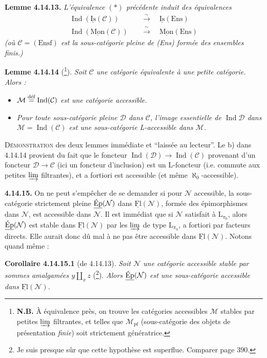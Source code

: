\documentclass[11pt]{article}
\newcommand{\msp}[1]{\marginpar{\footnotesize [#1]}}
\newcommand{\uFl}{\underline{\mathrm{Fl}}}
\newcommand{\uIs}{\underline{\mathrm{Is}}}
\newcommand{\uMon}{\underline{\mathrm{Mon}}}
\newcommand{\uEp}{\underline{\textup{Ép}}}
\newcommand{\defeq}{\overset{\textup{déf}}{=}}
\newcommand{\Ind}{\operatorname{Ind}}
\newcommand{\Ens}{\mathrm{Ens}}
\begin{document}
\textbf{Lemme 4.14.13.} \textit{L'équivalence $(*)$ précédente induit des équivalences}
\[
\begin{aligned}
\Ind(\uIs(\mathcal{C})) \quad &\xrightarrow{\ \sim\ } \quad \uIs(\Ens) \\
\Ind(\uMon(\mathcal{C})) \quad &\xrightarrow{\ \sim\ } \quad \uMon(\Ens)
\end{aligned}
\]
\textit{(où $\mathcal{C} = (\mathrm{Ensf})$ est la sous-catégorie pleine de \textup{(Ens)} formée des ensembles \textup{finis}.)}

\textbf{Lemme 4.14.14} (\footnote[166]{\textbf{N.B.} À équivalence près, on trouve les catégories accessibles $\mathcal{M}$ stables par petites $\varinjlim$ filtrantes, et telles que $\mathcal{M}_{\mathrm{pf}}$ (sous-catégorie des objets de présentation \textit{finie}) soit strictement génératrice.}). \textit{Soit $\mathcal{C}$ une catégorie équivalente à une petite catégorie. Alors :}
\begin{itemize}[nosep]
\item[\textit{a)}] \textit{$\mathcal{M} \defeq \Ind(\mathcal{C})$ est une catégorie accessible.}
\item[\textit{b)}] \textit{Pour toute sous-catégorie pleine $\mathcal{D}$ dans $\mathcal{C}$, l'image essentielle de $\Ind\mathcal{D}$ dans $\mathcal{M} = \Ind(\mathcal{C})$ est une sous-catégorie L-accessible dans $\mathcal{M}$.}
\end{itemize}
\textsc{Démonstration} des deux lemmes immédiate et ``laissée au lecteur''. Le b) dans 4.14.14 provient du fait que le foncteur $\Ind(\mathcal{D}) \longrightarrow \Ind(\mathcal{C})$ provenant d'un foncteur $\mathcal{D} \longrightarrow \mathcal{C}$ (ici un
\msp{page 387}
foncteur d'inclusion) est un L-foncteur (i.e. commute aux petites $\varinjlim$ filtrantes), et a fortiori est accessible (et même $\aleph_0$-accessible).

\textbf{4.14.15.} On ne peut s'empêcher de se demander si pour $\mathcal{N}$ accessible, la sous-catégorie strictement pleine $\uEp(\mathcal{N})$ dans $\uFl(\mathcal{N})$, formée des épimorphismes dans $\mathcal{N}$, est accessible dans $\mathcal{N}$. Il est immédiat que si $\mathcal{N}$ satisfait à $\mathrm{L}_{\pi_0}$, alors $\uEp(\mathcal{N})$ est stable dans $\uFl(\mathcal{N})$ par les $\varinjlim$ de type $\mathrm{L}_{\pi_0}$, a fortiori par facteurs directs. Elle aurait donc dû mal à ne pas être accessible dans $\uFl(\mathcal{N})$. Notons quand même : %

\textbf{Corollaire 4.14.15.1} (de 4.14.13). \textit{Soit $\mathcal{N}$ une catégorie accessible stable par sommes amalgamées $y \amalg_x z$} (\footnote[167]{Je suis presque sûr que cette hypothèse est superflue. Comparer page 390.}). \textit{Alors $\uEp(\mathcal{N})$ est une sous-catégorie accessible dans $\uFl(\mathcal{N})$.}
\end{document}
